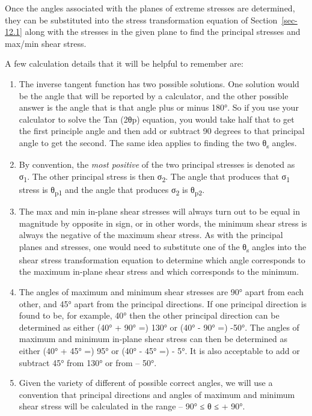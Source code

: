 \documentclass[
  letterpaper,
  DIV=11,
  numbers=noendperiod]{scrreprt}
\theoremstyle{definition}
\theoremstyle{remark}
\begin{document}
Once the angles associated with the planes of extreme stresses are
determined, they can be substituted into the stress transformation
equation of Section~\ref{sec-12.1} along with the stresses in the given
plane to find the principal stresses and max/min shear stress.

A few calculation details that it will be helpful to remember are:

\begin{enumerate}
\def\labelenumi{\arabic{enumi}.}
\item
  The inverse tangent function has two possible solutions. One solution
  would be the angle that will be reported by a calculator, and the
  other possible answer is the angle that is that angle plus or minus
  180°. So if you use your calculator to solve the Tan (2θp) equation,
  you would take half that to get the first principle angle and then add
  or subtract 90 degrees to that principal angle to get the second. The
  same idea applies to finding the two θ\textsubscript{s} angles.
\item
  By convention, the \emph{most positive} of the two principal stresses
  is denoted as σ\textsubscript{1}. The other principal stress is then
  σ\textsubscript{2}. The angle that produces that σ\textsubscript{1}
  stress is θ\textsubscript{p1} and the angle that produces
  σ\textsubscript{2} is θ\textsubscript{p2}.
\item
  The max and min in-plane shear stresses will always turn out to be
  equal in magnitude by opposite in sign, or in other words, the minimum
  shear stress is always the negative of the maximum shear stress. As
  with the principal planes and stresses, one would need to substitute
  one of the θ\textsubscript{s} angles into the shear stress
  transformation equation to determine which angle corresponds to the
  maximum in-plane shear stress and which corresponds to the minimum.
\item
  The angles of maximum and minimum shear stresses are 90° apart from
  each other, and 45° apart from the principal directions. If one
  principal direction is found to be, for example, 40° then the other
  principal direction can be determined as either (40° + 90° =) 130° or
  (40° - 90° =) -50°. The angles of maximum and minimum in-plane shear
  stress can then be determined as either (40° + 45° =) 95° or (40° -
  45° =) - 5°. It is also acceptable to add or subtract 45° from 130° or
  from -- 50°.
\item
  Given the variety of different of possible correct angles, we will use
  a convention that principal directions and angles of maximum and
  minimum shear stress will be calculated in the range -- 90° ≤ θ ≤ +
  90°.
\end{enumerate}
\end{document}
